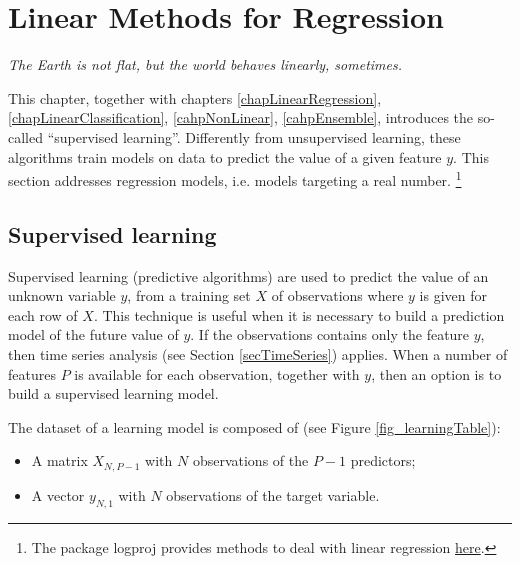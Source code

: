 \chapter{Linear Methods for Regression}{} \label{chapLinearRegression}

\epigraph{\textit{The Earth is not flat, but the world behaves linearly, sometimes.}}{}

This chapter, together with chapters \ref{chapLinearRegression}, \ref{chapLinearClassification}, \ref{cahpNonLinear}, \ref{cahpEnsemble}, introduces the so-called “supervised learning”. Differently from unsupervised learning, these algorithms train models on data to predict the value of a given feature $y$. This section addresses regression models, i.e. models targeting a real number. \footnote{The package logproj provides methods to deal with linear regression \href{https://github.com/aletuf93/logproj/blob/master/logproj/M_learningMethod/linear_models.py}{here}.} 

\section{Supervised learning} \label{supervisedLearning}
Supervised learning (predictive algorithms) are used to predict the value of an unknown variable $y$, from a training set $X$ of observations where $y$ is given for each row of $X$. This technique is useful when it is necessary to build a prediction model of the future value of $y$. If the observations contains only the feature $y$, then time series analysis (see Section \ref{secTimeSeries}) applies. When a number of features $P$ is available for each observation, together with $y$, then an option is to build a supervised learning model.

The dataset of a learning model is composed of (see Figure \ref{fig_learningTable}):
\begin{itemize}
    \item A matrix $X_{N,P-1}$ with $N$ observations of the $P-1$ predictors;
    \item A vector $y_{N,1}$ with $N$ observations of the target variable.
\end{itemize}

